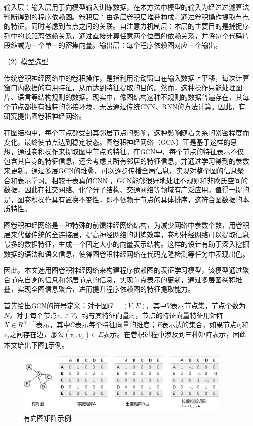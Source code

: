 输入层：输入层用于向模型输入训练数据，在本方法中模型的输入为经过过滤算法判断得到的程序依赖图。卷积层：由多层卷积层堆叠构成，通过卷积操作提取节点的特征，同时考虑到节点之间的关联。自注意力机制层：本层的主要目的是捕捉序列中的长距离依赖关系，通过直接计算任意两个位置的依赖关系，并将每个代码片段缩减为一个单一的密集向量。输出层：每个程序依赖图对应一个输出。

（2）模型选型

传统卷积神经网络中的卷积操作，是指利用滑动窗口在输入数据上平移，每次计算窗口内数据的有用特征，从而达到特征提取的目的。然而，这种操作只能处理图片、语言等结构规则的数据。现实中，像图结构这种不规则的数据普遍存在，其每个节点都拥有独特的邻接环境，无法通过传统CNN、RNN的方法计算。因此，有研究\cite{kipf2017semisupervised}提出图卷积神经网络。

在图结构中，每个节点都受到其邻居节点的影响，这种影响随着关系的紧密程度而变化，最终使节点达到稳定状态。图卷积神经网络（GCN）正是基于这样的思想，通过卷积操作来提取图中节点的特征。在GCN中，每个节点的特征表示不仅包含其自身的特征信息，还会考虑其所有邻居的特征信息，并通过学习得到的参数来更新。通过多层GCN的堆叠，可以逐步传播全局信息，实现对整个图的信息聚合和表示学习。相较于表真的CNN ，GCN能够很好地处理不规则和非欧氏空间的数据，因此在社交网络、化学分子结构、交通网络等领域有广泛应用。值得一提的是，图卷积操作具有置换不变性，即不依赖于节点的具体排序，这符合图数据的本质特性。

图卷积神经网络是一种特殊的前馈神经网络结构，为减少网络中参数个数，用卷积层来代替传统的全连接层，提高神经网络的训练效率，卷积神经网络可以提取信息最多的数据特征，生成一个固定大小的向量表示结构。这样的设计有助于深入挖掘数据的语法和语义信息，使得图卷积神经网络在代码克隆检测等任务中表现出色。

因此，本文选用图卷积神经网络来构建程序依赖图的表征学习模型，该模型通过聚合节点自身的信息和邻居节点的信息，实现节点表示的更新，通过多层图卷积堆叠，实现全图信息聚合，进而提升程序依赖图的特征提取能力。

首先给出GCN的符号定义：对于图$G=\left(V,E\right)$，其中$V$表示节点集，节点个数为$N$，对于每个节点$v_i \in V$，均有其特征向量$x_i$，节点的特征向量特征用矩阵$X \in R^{N×C}$表示，其中$C$表示每个特征向量的维度；$E$表示边的集合，如果节点$v_i$和$v_j$之间存在边，那么$\left(v_i,v_j\right) \in E$表示。在卷积过程中涉及到三种矩阵表示，因此本文给出下图\ref{fig:graph}示例。

\begin{figure}[H]
  \centering
  \includegraphics[width=0.95\textwidth]{figures/graph.png}
  \caption{有向图矩阵示例}\label{fig:graph}
\end{figure}


